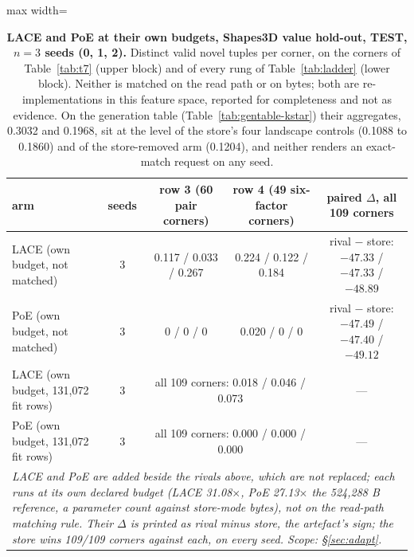 \documentclass{article} %
\begin{document}
\begin{table}[h]
\centering\scriptsize
\caption{\textbf{LACE and PoE at their own budgets, Shapes3D value hold-out, TEST, $n=3$ seeds (0, 1,
2).} Distinct valid novel tuples per corner, on the corners of Table~\ref{tab:t7} (upper block) and of
every rung of Table~\ref{tab:ladder} (lower block). Neither is matched on the read path or on bytes;
both are re-implementations in this feature space, reported for completeness and not as evidence. On
the generation table (Table~\ref{tab:gentable-kstar}) their aggregates, 0.3032 and 0.1968, sit at the %
level of the store's four landscape controls (0.1088 to 0.1860) and of the store-removed arm %
(0.1204), and neither renders an exact-match request on any seed.} %
\label{tab:lace-poe}
\setlength{\tabcolsep}{2.6pt}
\begin{adjustbox}{max width=\linewidth}\begin{tabular}{lcccc}
\toprule
arm & seeds & row 3 (60 pair corners) & row 4 (49 six-factor corners) & paired $\Delta$, all 109 corners \\ %
\midrule
LACE (own budget, not matched) & 3 & 0.117 / 0.033 / 0.267 & 0.224 / 0.122 / 0.184 & rival $-$ store: $-47.33$ / $-47.33$ / $-48.89$ \\
PoE (own budget, not matched) & 3 & 0 / 0 / 0 & 0.020 / 0 / 0 & rival $-$ store: $-47.49$ / $-47.40$ / $-49.12$ \\
LACE (own budget, 131,072 fit rows) & 3 & \multicolumn{2}{c}{all 109 corners: 0.018 / 0.046 / 0.073} & --- \\ %
PoE (own budget, 131,072 fit rows) & 3 & \multicolumn{2}{c}{all 109 corners: 0.000 / 0.000 / 0.000} & --- \\ %
\multicolumn{5}{p{15cm}}{\emph{LACE and PoE are added beside the rivals above, which are not replaced; each runs at its own declared budget (LACE 31.08$\times$, PoE 27.13$\times$ the 524,288 B reference, a parameter count against store-mode bytes), not on the read-path matching rule. Their $\Delta$ is printed as rival minus store, the artefact's sign; the store wins 109/109 corners against each, on every seed. Scope: \S\ref{sec:adapt}.}} \\
\bottomrule
\end{tabular}\end{adjustbox}


\end{table}
\end{document}
